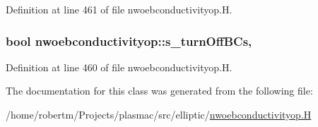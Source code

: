 Definition at line 461 of file nwoebconductivityop.\+H.

\subsubsection[{\texorpdfstring{s\+\_\+turn\+Off\+B\+Cs}{s_turnOffBCs}}]{\setlength{\rightskip}{0pt plus 5cm}bool nwoebconductivityop\+::s\+\_\+turn\+Off\+B\+Cs\hspace{0.3cm}{\ttfamily [static]}, {\ttfamily [protected]}}\hypertarget{classnwoebconductivityop_ae0c7df8e6f421b06893cfe635230e48b}{}\label{classnwoebconductivityop_ae0c7df8e6f421b06893cfe635230e48b}


Definition at line 460 of file nwoebconductivityop.\+H.



The documentation for this class was generated from the following file\+:\begin{DoxyCompactItemize}
\item 
/home/robertm/\+Projects/plasmac/src/elliptic/\hyperlink{nwoebconductivityop_8H}{nwoebconductivityop.\+H}\end{DoxyCompactItemize}
